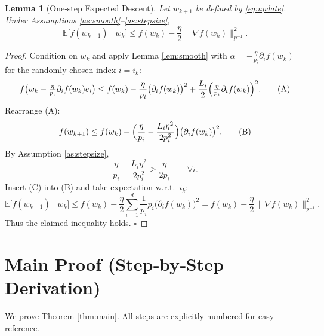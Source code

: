 \documentclass{article}
\newtheorem{lemma}{Lemma}[section]
\begin{document}
\begin{lemma}[One‑step Expected Descent]
\label{lem:descent}
Let $w_{k+1}$ be defined by \eqref{eq:update}.  Under Assumptions \ref{as:smooth}–\ref{as:stepsize},
\[
\mathbb{E}\!\bigl[f(w_{k+1})\mid w_k\bigr]\le
f(w_k)-\frac{\eta}{2}\,\|\nabla f(w_k)\|_{p^{-1}}^{2}.
\]
\end{lemma}
\begin{proof}
Condition on $w_k$ and apply Lemma \ref{lem:smooth} with $\alpha=-\frac{\eta}{p_i}\partial_i f(w_k)$ for the randomly chosen index $i=i_k$:
\[
f\bigl(w_k-\tfrac{\eta}{p_i}\partial_i f(w_k)e_i\bigr)
\le f(w_k)-\frac{\eta}{p_i}\bigl(\partial_i f(w_k)\bigr)^{2}
+\frac{L_i}{2}\Bigl(\tfrac{\eta}{p_i}\partial_i f(w_k)\Bigr)^{2}.
\tag{A}
\]
Rearrange (A):
\[
f(w_{k+1})\le f(w_k)-\Bigl(\frac{\eta}{p_i}-\frac{L_i\eta^{2}}{2p_i^{2}}\Bigr)\bigl(\partial_i f(w_k)\bigr)^{2}.
\tag{B}
\]
By Assumption \ref{as:stepsize},
\[
\frac{\eta}{p_i}-\frac{L_i\eta^{2}}{2p_i^{2}}
\ge\frac{\eta}{2p_i}\qquad\forall i.
\tag{C}
\]
Insert (C) into (B) and take expectation w.r.t.\ $i_k$:
\[
\mathbb{E}\!\bigl[f(w_{k+1})\mid w_k\bigr]
\le f(w_k)-\frac{\eta}{2}\sum_{i=1}^{d}\frac{1}{p_i}p_i\bigl(\partial_i f(w_k)\bigr)^{2}
= f(w_k)-\frac{\eta}{2}\,\|\nabla f(w_k)\|_{p^{-1}}^{2}.
\tag{D}
\]
Thus the claimed inequality holds. $\square$
\end{proof}

\section*{Main Proof (Step‑by‑Step Derivation)}
We prove Theorem \ref{thm:main}.  All steps are explicitly numbered for easy reference.
\end{document}

